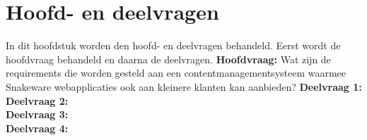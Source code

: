 \section{Hoofd- en deelvragen}
In dit hoofdstuk worden den hoofd- en deelvragen behandeld.
Eerst wordt de hoofdvraag behandeld en daarna de deelvragen.
\whitespace
\textbf{Hoofdvraag:} Wat zijn de requirements die worden gesteld aan een contentmanagementsysteem waarmee
Snakeware webapplicaties ook aan kleinere klanten kan aanbieden?
\whitespace
\textbf{Deelvraag 1:} \SubquestionOne   \\
\textbf{Deelvraag 2:} \SubquestionTwo   \\
\textbf{Deelvraag 3:} \SubquestionThree \\
\textbf{Deelvraag 4:} \SubquestionFour  \\
